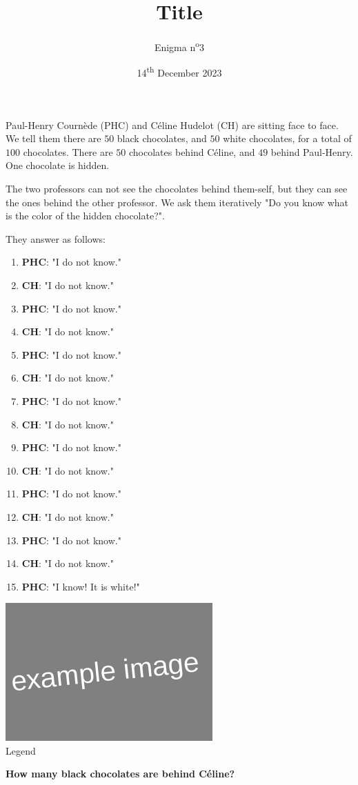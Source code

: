 \documentclass[a4paper, top=10mm]{article}
\title{\textbf{\huge{Title}}}
\author{Enigma n\textsuperscript{o}3}
\date{14\textsuperscript{th} December 2023}
\begin{document}
	\maketitle
	
	Paul-Henry Cournède (PHC) and Céline Hudelot (CH) are sitting face to face.
	We tell them there are $50$ black chocolates, and $50$ white chocolates, for a total of $100$ chocolates.
	There are $50$ chocolates behind Céline, and $49$ behind Paul-Henry.
	One chocolate is hidden.
	
	The two professors can not see the chocolates behind them-self, but they can see the ones behind the other professor.
	We ask them iteratively "Do you know what is the color of the hidden chocolate?".
	
	They answer as follows:
	
	\begin{enumerate}
		\item \textbf{PHC}: "I do not know."
		\item \textbf{CH}: "I do not know."
		\item \textbf{PHC}: "I do not know."
		\item \textbf{CH}: "I do not know."
		\item \textbf{PHC}: "I do not know."
		\item \textbf{CH}: "I do not know."
		\item \textbf{PHC}: "I do not know."
		\item \textbf{CH}: "I do not know."
		\item \textbf{PHC}: "I do not know."
		\item \textbf{CH}: "I do not know."
		\item \textbf{PHC}: "I do not know."
		\item \textbf{CH}: "I do not know."
		\item \textbf{PHC}: "I do not know."
		\item \textbf{CH}: "I do not know."
		\item \textbf{PHC}: "I know! It is white!"
	\end{enumerate}
	
	\begin{center}
		\includegraphics[height=150pt]{00example.png}\\
		Legend
	\end{center}
	
	\textbf{How many black chocolates are behind Céline?}
	
\end{document}
